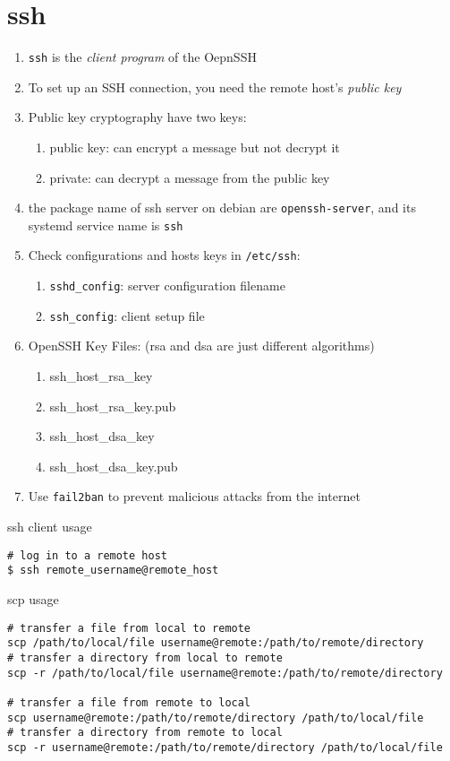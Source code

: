 \documentclass[12pt,a4paper]{article}
\begin{document}
\section{ssh}
\begin{enumerate}
	\item \texttt{ssh} is the \textit{client program} of the OepnSSH
	\item To set up an SSH connection, you need the remote host's \textit{public key}
	\item Public key cryptography have two keys:
	\begin{enumerate}
		\item public key: can encrypt a message but not decrypt it
		\item private: can decrypt a message from the public key
	\end{enumerate}
	\item the package name of ssh server on debian are \texttt{openssh-server}, and its systemd service name is \texttt{ssh}
	\item Check configurations and hosts keys in \texttt{/etc/ssh}:
	\begin{enumerate}
		\item \texttt{sshd\_config}: server configuration filename
		\item \texttt{ssh\_config}: client setup file
	\end{enumerate}
	\item OpenSSH Key Files: (rsa and dsa are just different algorithms)
	\begin{enumerate}
		\item ssh\_host\_rsa\_key
		\item ssh\_host\_rsa\_key.pub
		\item ssh\_host\_dsa\_key
		\item ssh\_host\_dsa\_key.pub		
	\end{enumerate}
	\item Use \texttt{fail2ban} to prevent malicious attacks from the internet
\end{enumerate}
ssh client usage
\begin{footnotesize}
\begin{verbatim}
# log in to a remote host
$ ssh remote_username@remote_host
\end{verbatim}
\end{footnotesize}
scp usage
\begin{footnotesize}
\begin{verbatim}
# transfer a file from local to remote
scp /path/to/local/file username@remote:/path/to/remote/directory
# transfer a directory from local to remote
scp -r /path/to/local/file username@remote:/path/to/remote/directory

# transfer a file from remote to local
scp username@remote:/path/to/remote/directory /path/to/local/file 
# transfer a directory from remote to local
scp -r username@remote:/path/to/remote/directory /path/to/local/file 
\end{verbatim}
\end{footnotesize}
\end{document}

